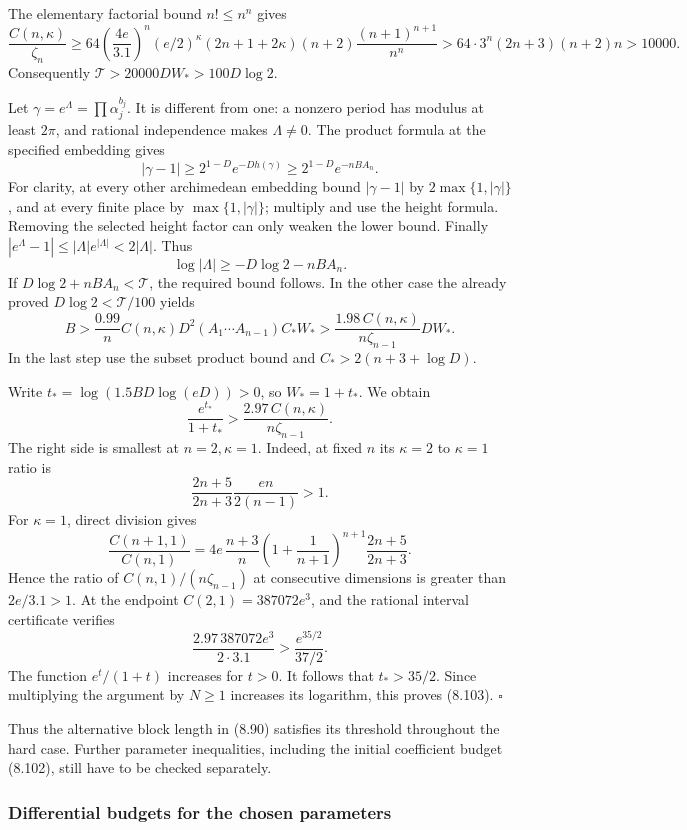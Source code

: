 \documentclass[
  11pt,
  a4paper,
]{article}
\begin{document}
The elementary factorial bound \(n!\le n^n\) gives \[
\frac{C(n,\kappa)}{\zeta_n}
\ge64\left(\frac{4e}{3.1}\right)^n
(e/2)^\kappa(2n+1+2\kappa)(n+2)
\frac{(n+1)^{n+1}}{n^n}
>64\cdot3^n(2n+3)(n+2)n>10000.
\] Consequently \(\mathcal T>20000DW_*>100D\log2\).

Let \(\gamma=e^\Lambda=\prod\alpha_j^{b_j}\). It is different from one:
a nonzero period has modulus at least \(2\pi\), and rational
independence makes \(\Lambda\ne0\). The product formula at the specified
embedding gives \[
|\gamma-1|\ge2^{1-D}e^{-Dh(\gamma)}
\ge2^{1-D}e^{-nBA_n}.
\] For clarity, at every other archimedean embedding bound
\(|\gamma-1|\) by \(2\max\{1,|\gamma|\}\), and at every finite place by
\(\max\{1,|\gamma|\}\); multiply and use the height formula. Removing
the selected height factor can only weaken the lower bound. Finally
\(|e^\Lambda-1|\le|\Lambda|e^{|\Lambda|}<2|\Lambda|\). Thus \[
\log|\Lambda|\ge-D\log2-nBA_n.
\] If \(D\log2+nBA_n<\mathcal T\), the required bound follows. In the
other case the already proved \(D\log2<\mathcal T/100\) yields \[
B>\frac{0.99}{n}C(n,\kappa)D^2
(A_1\cdots A_{n-1})C_*W_*
>\frac{1.98\,C(n,\kappa)}{n\zeta_{n-1}}DW_*.
\] In the last step use the subset product bound and
\(C_*>2(n+3+\log D)\).

Write \(t_*=\log(1.5BD\log(eD))>0\), so \(W_*=1+t_*\). We obtain \[
\frac{e^{t_*}}{1+t_*}>
\frac{2.97\,C(n,\kappa)}{n\zeta_{n-1}}.
\] The right side is smallest at \(n=2,\kappa=1\). Indeed, at fixed
\(n\) its \(\kappa=2\) to \(\kappa=1\) ratio is \[
\frac{2n+5}{2n+3}\frac{en}{2(n-1)}>1.
\] For \(\kappa=1\), direct division gives \[
\frac{C(n+1,1)}{C(n,1)}
=4e\,\frac{n+3}{n}
\left(1+\frac1{n+1}\right)^{n+1}
\frac{2n+5}{2n+3}.
\] Hence the ratio of \(C(n,1)/(n\zeta_{n-1})\) at consecutive
dimensions is greater than \(2e/3.1>1\). At the endpoint
\(C(2,1)=387072e^3\), and the rational interval certificate verifies \[
\frac{2.97\,387072e^3}{2\cdot3.1}>
\frac{e^{35/2}}{37/2}.
\] The function \(e^t/(1+t)\) increases for \(t>0\). It follows that
\(t_*>35/2\). Since multiplying the argument by \(N\ge1\) increases its
logarithm, this proves (8.103). \(\square\)

Thus the alternative block length in (8.90) satisfies its threshold
throughout the hard case. Further parameter inequalities, including the
initial coefficient budget (8.102), still have to be checked separately.

\subsubsection{Differential budgets for the chosen
parameters}\label{differential-budgets-for-the-chosen-parameters}
\end{document}
